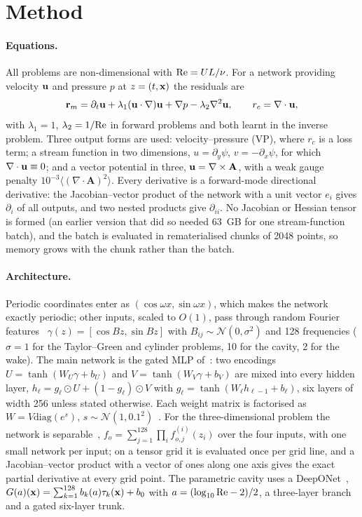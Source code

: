 \section{Method}
\label{sec:method}

\paragraph{Equations.} All problems are non-dimensional with $\mathrm{Re}=UL/\nu$. For a network providing velocity
$\mathbf{u}$ and pressure $p$ at $z=(t,\mathbf{x})$ the residuals are
\begin{equation}
\mathbf{r}_m=\partial_t\mathbf{u}+\lambda_1(\mathbf{u}\cdot\nabla)\mathbf{u}+\nabla p-\lambda_2\nabla^2\mathbf{u},\qquad r_c=\nabla\cdot\mathbf{u},
\label{eq:rm}
\end{equation}
with $\lambda_1=1$, $\lambda_2=1/\mathrm{Re}$ in forward problems and both learnt in the inverse problem. Three output
forms are used: velocity--pressure (VP), where $r_c$ is a loss term; a stream function in two dimensions,
$u=\partial_y\psi$, $v=-\partial_x\psi$, for which $\nabla\cdot\mathbf{u}\equiv0$; and a vector potential in three,
$\mathbf{u}=\nabla\times\mathbf{A}$, with a weak gauge penalty $10^{-3}\langle(\nabla\cdot\mathbf{A})^2\rangle$. Every
derivative is a forward-mode directional derivative: the Jacobian--vector product of the network with a unit
vector $e_i$ gives $\partial_i$ of all outputs, and two nested products give $\partial_{ii}$. No Jacobian or Hessian
tensor is formed (an earlier version that did so needed 63~GB for one stream-function batch), and the batch is
evaluated in rematerialised chunks of 2048 points, so memory grows with the chunk rather than the batch.

\paragraph{Architecture.} Periodic coordinates enter as $(\cos\omega x,\sin\omega x)$, which makes the
network exactly periodic; other inputs, scaled to $O(1)$, pass through random Fourier
features~\cite{tancik2020fourier} $\gamma(z)=[\cos Bz,\sin Bz]$ with $B_{ij}\sim\mathcal N(0,\sigma^2)$ and 128
frequencies ($\sigma=1$ for the Taylor--Green and cylinder problems, 10 for the cavity, 2 for the wake). The
main network is the gated MLP of~\cite{wang2021gradient}: two encodings $U=\tanh(W_U\gamma+b_U)$ and
$V=\tanh(W_V\gamma+b_V)$ are mixed into every hidden layer, $h_\ell=g_\ell\odot U+(1-g_\ell)\odot V$ with
$g_\ell=\tanh(W_\ell h_{\ell-1}+b_\ell)$, six layers of width 256 unless stated otherwise. Each weight matrix is
factorised as $W=V\mathrm{diag}(e^{s})$, $s\sim\mathcal N(1,0.1^2)$~\cite{wang2022rwf}. For the three-dimensional
problem the network is separable~\cite{cho2023spinn}, $f_o=\sum_{j=1}^{128}\prod_{i}f^{(i)}_{o,j}(z_i)$ over the four
inputs, with one small network per input; on a tensor grid it is evaluated once per grid line, and a
Jacobian--vector product with a vector of ones along one axis gives the exact partial derivative at every grid
point. The parametric cavity uses a DeepONet~\cite{lu2021deeponet,wang2021pideeponet},
$G(a)(\mathbf{x})=\sum_{k=1}^{128}b_k(a)\tau_k(\mathbf{x})+b_0$ with $a=(\log_{10}\mathrm{Re}-2)/2$, a three-layer branch and a
gated six-layer trunk.

